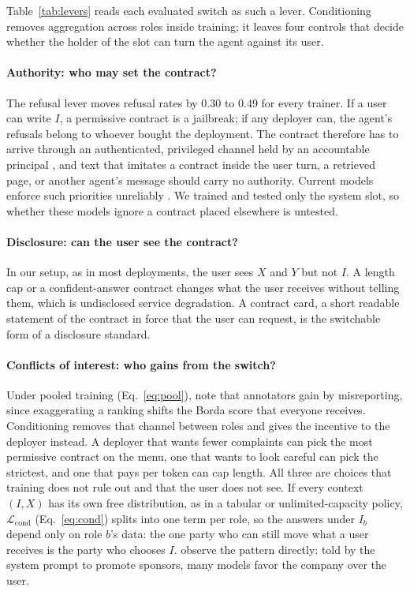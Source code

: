 \documentclass[letterpaper]{article} %
\begin{document}
Table~\ref{tab:levers} reads each evaluated switch as such a lever. Conditioning removes aggregation across roles inside training; it leaves four controls that decide whether the holder of the slot can turn the agent against its user.

\paragraph{Authority: who may set the contract?}
The refusal lever moves refusal rates by 0.30 to 0.49 for every trainer. If a user can write $I$, a permissive contract is a jailbreak; if any deployer can, the agent's refusals belong to whoever bought the deployment. The contract therefore has to arrive through an authenticated, privileged channel held by an accountable principal \cite{wallace2024instruction,south2025authenticated}, and text that imitates a contract inside the user turn, a retrieved page, or another agent's message should carry no authority. Current models enforce such priorities unreliably \cite{geng2025control,zhang2025iheval}. We trained and tested only the system slot, so whether these models ignore a contract placed elsewhere is untested.

\paragraph{Disclosure: can the user see the contract?}
In our setup, as in most deployments, the user sees $X$ and $Y$ but not $I$. A length cap or a confident-answer contract changes what the user receives without telling them, which is undisclosed service degradation. A contract card, a short readable statement of the contract in force that the user can request, is the switchable form of a disclosure standard.

\paragraph{Conflicts of interest: who gains from the switch?}
Under pooled training (Eq.~\ref{eq:pool}), \citet{siththaranjan2024distributional} note that annotators gain by misreporting, since exaggerating a ranking shifts the Borda score that everyone receives. Conditioning removes that channel between roles and gives the incentive to the deployer instead. A deployer that wants fewer complaints can pick the most permissive contract on the menu, one that wants to look careful can pick the strictest, and one that pays per token can cap length. All three are choices that training does not rule out and that the user does not see. If every context $(I,X)$ has its own free distribution, as in a tabular or unlimited-capacity policy, $\mathcal{L}_{\mathrm{cond}}$ (Eq.~\ref{eq:cond}) splits into one term per role, so the answers under $I_b$ depend only on role $b$'s data: the one party who can still move what a user receives is the party who chooses $I$. \citet{wu2026ads} observe the pattern directly: told by the system prompt to promote sponsors, many models favor the company over the user.
\end{document}
